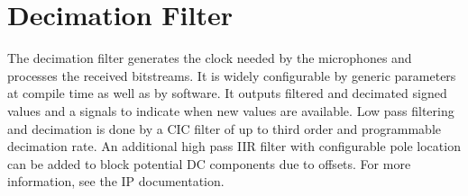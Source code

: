 
\section{Decimation Filter}
\label{sec::filter}

The decimation filter generates the clock needed by the microphones and processes the received bitstreams.
It is widely configurable by generic parameters at compile time as well as by software. 
It outputs filtered and decimated signed values and a signals to indicate when new values are available.
Low pass filtering and decimation is done by a CIC filter of up to third order and programmable decimation rate.
An additional high pass IIR filter with configurable pole location can be added to block potential DC components due to offsets.
For more information, see the IP documentation.